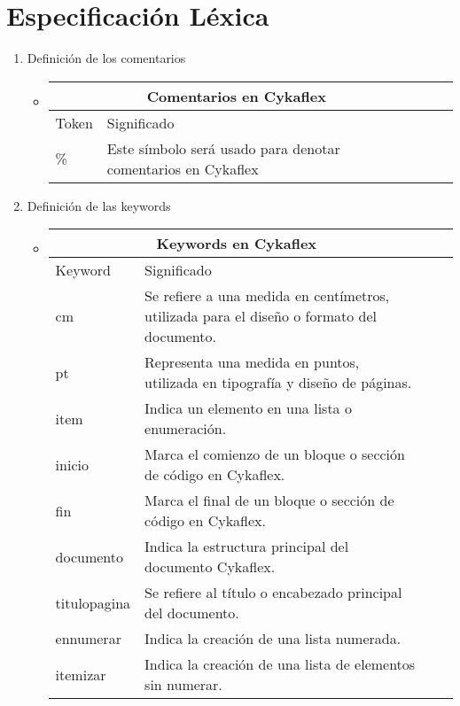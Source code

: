 \documentclass[12pt]{article}
\begin{document}
\section{Especificación Léxica}
\indent
\begin{enumerate}
    \item Definición de los comentarios 
        \begin{itemize}
            \item \begin{tabular}{ |p{6cm}||p{8cm}|p{3cm}|p{3cm}|  }
            \hline
            \multicolumn{2}{|c|}{Comentarios en Cykaflex} \\
            \hline  Token& Significado\\ 
            \hline
            \%   & Este símbolo será usado para denotar comentarios en Cykaflex\\
            \hline
            \end{tabular}
        \end{itemize}
    \item Definición de las keywords
        \begin{itemize}
            \item \begin{tabular}{ |p{6cm}||p{8cm}|p{3cm}|p{3cm}|  }
            \hline
            \multicolumn{2}{|c|}{Keywords en Cykaflex} \\
            \hline Keyword& Significado\\
            \hline cm & Se refiere a una medida en centímetros, utilizada para el diseño o formato del documento.\\
            \hline pt & Representa una medida en puntos, utilizada en tipografía y diseño de páginas.\\
            \hline item & Indica un elemento en una lista o enumeración.\\
            \hline inicio & Marca el comienzo de un bloque o sección de código en Cykaflex.\\
            \hline fin & Marca el final de un bloque o sección de código en Cykaflex.\\
            \hline documento & Indica la estructura principal del documento Cykaflex.\\
            \hline titulopagina & Se refiere al título o encabezado principal del documento.\\
            \hline ennumerar & Indica la creación de una lista numerada.\\
            \hline itemizar & Indica la creación de una lista de elementos sin numerar.\\

\end{tabular}
\end{itemize}
\end{enumerate}
\end{document}
